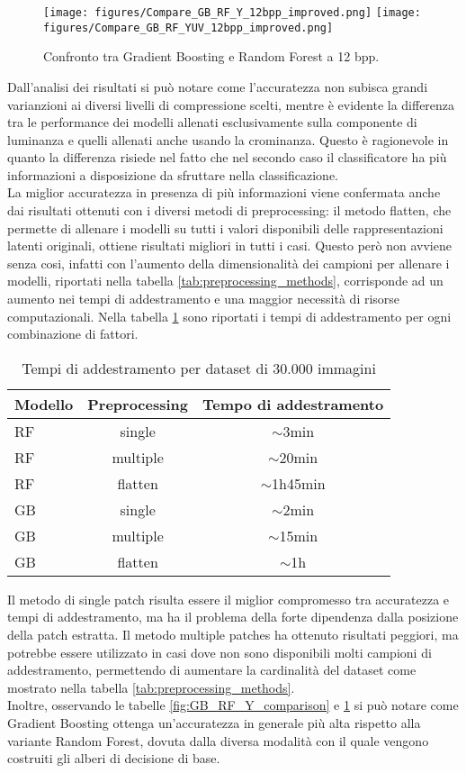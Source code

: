 \begin{figure}[H]
    \centering
    \texttt{[image: figures/Compare\_GB\_RF\_Y\_12bpp\_improved.png]}
    \texttt{[image: figures/Compare\_GB\_RF\_YUV\_12bpp\_improved.png]}
    \caption{Confronto tra Gradient Boosting e Random Forest a 12 bpp.}
    \label{fig:GB_RF_YUV_comparison}
\end{figure}
Dall'analisi dei risultati si può notare come l'accuratezza non subisca grandi varianzioni ai diversi livelli di compressione scelti, mentre è evidente la differenza tra le performance dei modelli allenati esclusivamente sulla componente di luminanza e quelli allenati anche usando la crominanza. Questo è ragionevole in quanto la differenza risiede nel fatto che nel secondo caso il classificatore ha più informazioni a disposizione da sfruttare nella classificazione.\\
La miglior accuratezza in presenza di più informazioni viene confermata anche dai risultati ottenuti con i diversi metodi di preprocessing: il metodo flatten, che permette di allenare i modelli su tutti i valori disponibili delle rappresentazioni latenti originali, ottiene risultati migliori in tutti i casi. Questo però non avviene senza cosi, infatti con l'aumento della dimensionalità dei campioni per allenare i modelli, riportati nella tabella \ref{tab:preprocessing_methods}, corrisponde ad un aumento nei tempi di addestramento e una maggior necessità di risorse computazionali. Nella tabella \ref{tab:training_times} sono riportati i tempi di addestramento per ogni combinazione di fattori.
\begin{table}[H]
\centering
\caption{Tempi di addestramento per dataset di $30.000$ immagini}\label{tab:training_times}
\begin{tabular}{l c c}
\toprule
Modello & Preprocessing & Tempo di addestramento \\
\midrule
RF &      single &  $\sim$3min \\
RF &    multiple &  $\sim$20min\\
RF &      flatten &  $\sim$1h45min\\
\midrule
GB &      single &  $\sim$2min \\
GB &    multiple &  $\sim$15min \\
GB &      flatten &  $\sim$1h \\
\bottomrule
\end{tabular}
\end{table}
Il metodo di single patch risulta essere il miglior compromesso tra accuratezza e tempi di addestramento, ma ha il problema della forte dipendenza dalla posizione della patch estratta. Il metodo multiple patches ha ottenuto risultati peggiori, ma potrebbe essere utilizzato in casi dove non sono disponibili molti campioni di addestramento, permettendo di aumentare la cardinalità del dataset come mostrato nella tabella \ref{tab:preprocessing_methods}.\\
Inoltre, osservando le tabelle \ref{fig:GB_RF_Y_comparison} e \ref{fig:GB_RF_YUV_comparison} si può notare come Gradient Boosting ottenga un'accuratezza in generale più alta rispetto alla variante Random Forest, dovuta dalla diversa modalità con il quale vengono costruiti gli alberi di decisione di base.\\